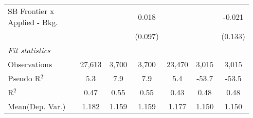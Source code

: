 \begin{tabular}{lcccccc}
   SB Frontier x Applied - Bkg.   &               &              & 0.018         &               &              & -0.021\\   
                                  &               &              & (0.097)       &               &              & (0.133)\\   
   \midrule
   \emph{Fit statistics}\\
   Observations                   & 27,613        & 3,700        & 3,700         & 23,470        & 3,015        & 3,015\\  
   Pseudo R$^2$                   & 5.3           & 7.9          & 7.9           & 5.4           & -53.7        & -53.5\\  
   R$^2$                          & 0.47          & 0.55         & 0.55          & 0.43          & 0.48         & 0.48\\  
Mean(Dep. Var.) & 1.182 & 1.159 & 1.159 & 1.177 & 1.150 & 1.150 \\
   

\end{tabular}

